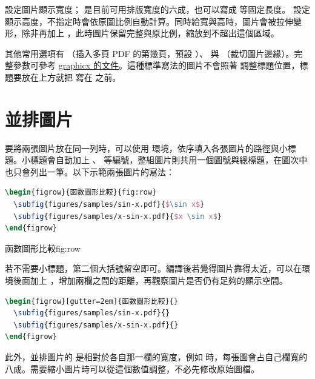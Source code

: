  設定圖片顯示寬度； 是目前可用排版寬度的六成，也可以寫成 \code{8cm} 等固定長度。 設定顯示高度，不指定時會依原圖比例自動計算。同時給寬與高時，圖片會被拉伸變形，除非再加上 ，此時圖片保留完整與原比例，縮放到不超出這個區域。

其他常用選項有 （插入多頁 PDF 的第幾頁，預設 ）、 與 （裁切圖片邊緣）。完整參數可參考 \href{https://ctan.org/pkg/graphicx}{graphicx 的文件}。這種標準寫法的圖片不會照著  調整標題位置，標題要放在上方就把 \code{\caption} 寫在  之前。

\section{並排圖片}

要將兩張圖片放在同一列時，可以使用  環境，依序填入各張圖片的路徑與小標題。小標題會自動加上 、 等編號，整組圖片則共用一個圖號與總標題，在圖次中也只會列出一筆。以下示範兩張圖片的寫法：

\begin{lstlisting}[language=latex]
\begin{figrow}{函數圖形比較}{fig:row}
  \subfig{figures/samples/sin-x.pdf}{$\sin x$}
  \subfig{figures/samples/x-sin-x.pdf}{$x \sin x$}
\end{figrow}
\end{lstlisting}

\begin{figrow}{函數圖形比較}{fig:row}
\end{figrow}

若不需要小標題，第二個大括號留空即可。編譯後若覺得圖片靠得太近，可以在環境後面加上 \code{[gutter=2em]}，增加兩欄之間的距離，再觀察圖片是否仍有足夠的顯示空間。

\begin{lstlisting}[language=latex]
\begin{figrow}[gutter=2em]{函數圖形比較}{}
  \subfig{figures/samples/sin-x.pdf}{}
  \subfig{figures/samples/x-sin-x.pdf}{}
\end{figrow}
\end{lstlisting}

此外，並排圖片的  是相對於各自那一欄的寬度，例如 \code{[width=0.8]} 時，每張圖會占自己欄寬的八成。需要縮小圖片時可以從這個數值調整，不必先修改原始圖檔。

